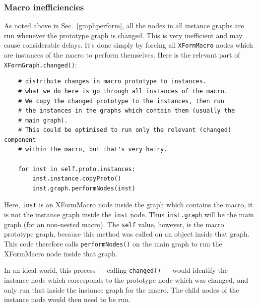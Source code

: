 \subsubsection{Macro inefficiencies}
\label{macroineff}
As noted above in Sec.~\ref{graphperform}, all the nodes in all instance
graphs are run whenever the prototype graph is changed. This is very
inefficient and may cause considerable delays. It's done simply by forcing all
\texttt{XFormMacro} nodes which are instances of the macro to perform themselves. Here
is the relevant part of \texttt{XFormGraph.changed()}:
\begin{lstlisting}
    # distribute changes in macro prototype to instances.
    # what we do here is go through all instances of the macro. 
    # We copy the changed prototype to the instances, then run
    # the instances in the graphs which contain them (usually the
    # main graph).
    # This could be optimised to run only the relevant (changed) component
    # within the macro, but that's very hairy.

    for inst in self.proto.instances:
        inst.instance.copyProto()
        inst.graph.performNodes(inst)
\end{lstlisting}
Here, \texttt{inst} is an XFormMacro node inside the graph which contains the
macro, it is not the instance graph inside the \texttt{inst} node. Thus
\texttt{inst.graph} will be the main graph (for an non-nested macro). The
\texttt{self} value, however, is the macro prototype graph, because this
method was called on an object inside that graph. This code therefore calls
\texttt{performNodes()} on the main graph to run the XFormMacro node inside
that graph. 

In an ideal world, this process --- calling \texttt{changed()} --- would identify
the instance node which corresponds to the prototype node which was changed, and only
run that inside the instance graph for the macro. The child nodes of the instance node
would then need to be run.
